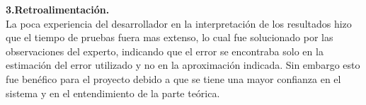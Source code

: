 \documentclass[12pt]{report}
\numberwithin{equation}{section}
\begin{document}
\begin{flushleft}
\textbf{3.Retroalimentaci\'on.}\\

\small{La poca experiencia del desarrollador en la interpretaci\'on de los resultados hizo que el tiempo de pruebas fuera mas extenso, lo cual fue solucionado por las observaciones del experto, indicando que el error se encontraba solo en la estimaci\'on del error utilizado y no en la aproximaci\'on indicada. Sin embargo esto fue benéfico para el proyecto debido a que se tiene una mayor confianza en el sistema y en el entendimiento de la parte teórica.}





\end{flushleft}
\end{document}
